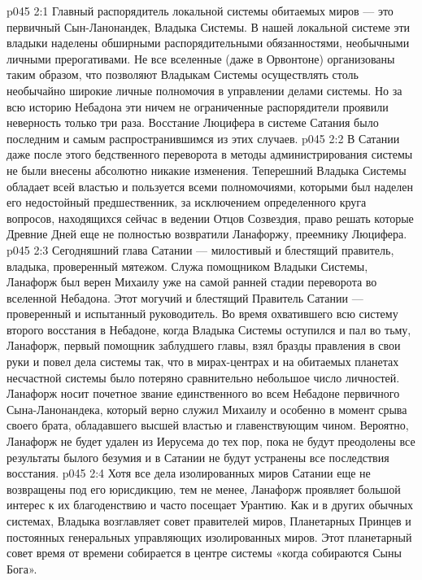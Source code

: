 \vs p045 2:1 Главный распорядитель локальной системы обитаемых миров --- это первичный Сын\hyp{}Ланонандек, Владыка Системы. В нашей локальной системе эти владыки наделены обширными распорядительными обязанностями, необычными личными прерогативами. Не все вселенные (даже в Орвонтоне) организованы таким образом, что позволяют Владыкам Системы осуществлять столь необычайно широкие личные полномочия в управлении делами системы. Но за всю историю Небадона эти ничем не ограниченные распорядители проявили неверность только три раза. Восстание Люцифера в системе Сатания было последним и самым распространившимся из этих случаев.
\vs p045 2:2 В Сатании даже после этого бедственного переворота в методы администрирования системы не были внесены абсолютно никакие изменения. Теперешний Владыка Системы обладает всей властью и пользуется всеми полномочиями, которыми был наделен его недостойный предшественник, за исключением определенного круга вопросов, находящихся сейчас в ведении Отцов Созвездия, право решать которые Древние Дней еще не полностью возвратили Ланафоржу, преемнику Люцифера.
\vs p045 2:3 \pc Сегодняшний глава Сатании --- милостивый и блестящий правитель, владыка, проверенный мятежом. Служа помощником Владыки Системы, Ланафорж был верен Михаилу уже на самой ранней стадии переворота во вселенной Небадона. Этот могучий и блестящий Правитель Сатании --- проверенный и испытанный руководитель. Во время охватившего всю систему второго восстания в Небадоне, когда Владыка Системы оступился и пал во тьму, Ланафорж, первый помощник заблудшего главы, взял бразды правления в свои руки и повел дела системы так, что в мирах\hyp{}центрах и на обитаемых планетах несчастной системы было потеряно сравнительно небольшое число личностей. Ланафорж носит почетное звание единственного во всем Небадоне первичного Сына\hyp{}Ланонандека, который верно служил Михаилу и особенно в момент срыва своего брата, обладавшего высшей властью и главенствующим чином. Вероятно, Ланафорж не будет удален из Иерусема до тех пор, пока не будут преодолены все результаты былого безумия и в Сатании не будут устранены все последствия восстания.
\vs p045 2:4 \pc Хотя все дела изолированных миров Сатании еще не возвращены под его юрисдикцию, тем не менее, Ланафорж проявляет большой интерес к их благоденствию и часто посещает Урантию. Как и в других обычных системах, Владыка возглавляет совет правителей миров, Планетарных Принцев и постоянных генеральных управляющих изолированных миров. Этот планетарный совет время от времени собирается в центре системы «когда собираются Сыны Бога».
